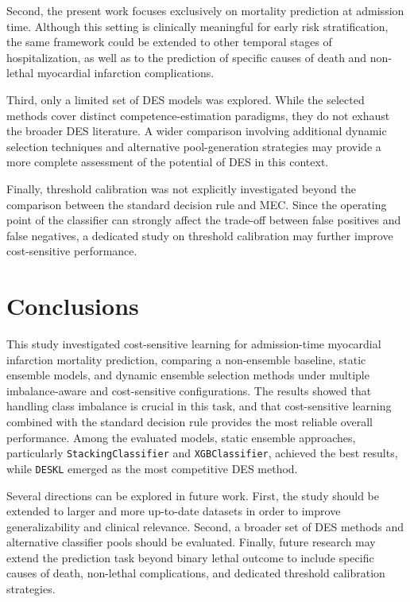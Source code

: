 \documentclass[conference]{IEEEtran}
\begin{document}
Second, the present work focuses exclusively on mortality prediction at admission time. Although this setting is clinically meaningful for early risk stratification, the same framework could be extended to other temporal stages of hospitalization, as well as to the prediction of specific causes of death and non-lethal myocardial infarction complications.

Third, only a limited set of DES models was explored. While the selected methods cover distinct competence-estimation paradigms, they do not exhaust the broader DES literature. A wider comparison involving additional dynamic selection techniques and alternative pool-generation strategies may provide a more complete assessment of the potential of DES in this context.

Finally, threshold calibration was not explicitly investigated beyond the comparison between the standard decision rule and MEC. Since the operating point of the classifier can strongly affect the trade-off between false positives and false negatives, a dedicated study on threshold calibration may further improve cost-sensitive performance.

\section{Conclusions} \label{sec:conclusions}

This study investigated cost-sensitive learning for admission-time myocardial infarction mortality prediction, comparing a non-ensemble baseline, static ensemble models, and dynamic ensemble selection methods under multiple imbalance-aware and cost-sensitive configurations. The results showed that handling class imbalance is crucial in this task, and that cost-sensitive learning combined with the standard decision rule provides the most reliable overall performance. Among the evaluated models, static ensemble approaches, particularly \texttt{StackingClassifier} and \texttt{XGBClassifier}, achieved the best results, while \texttt{DESKL} emerged as the most competitive DES method.

Several directions can be explored in future work. First, the study should be extended to larger and more up-to-date datasets in order to improve generalizability and clinical relevance. Second, a broader set of DES methods and alternative classifier pools should be evaluated. Finally, future research may extend the prediction task beyond binary lethal outcome to include specific causes of death, non-lethal complications, and dedicated threshold calibration strategies.



\end{document}
